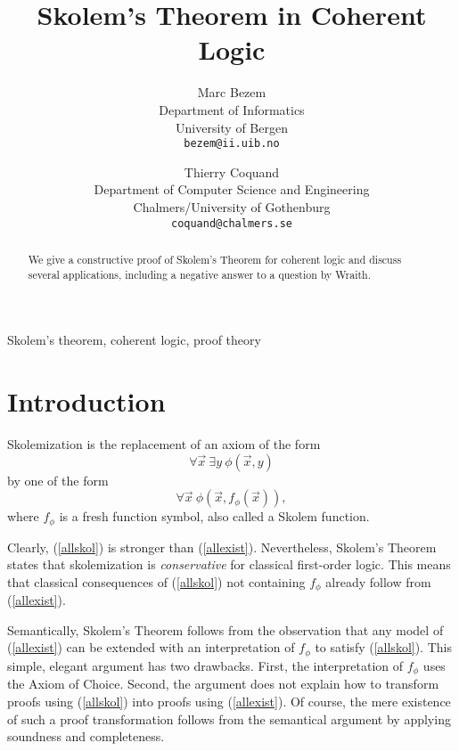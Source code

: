 \documentclass{fundam}
\begin{document}
\title{Skolem's Theorem in Coherent Logic}

\author{%
Marc Bezem\\
Department of Informatics\\
University of Bergen\\
\texttt{bezem@ii.uib.no}
\and
Thierry Coquand\\
Department of Computer Science and Engineering\\
Chalmers/University of Gothenburg\\
\texttt{coquand@chalmers.se}}

\maketitle



\begin{abstract}
We give a constructive proof of Skolem's Theorem for coherent logic
and discuss several applications, including a negative answer to 
a question by Wraith.
\end{abstract}

\begin{keywords}
Skolem's theorem, coherent logic, proof theory
\end{keywords}

\section*{Introduction}
Skolemization is the replacement of an axiom of the form
\begin{equation}\label{allexist}
\forall\vec{x}~\exists y~\phi(\vec{x},y)
\end{equation}
by one of the form
\begin{equation}\label{allskol}
\forall\vec{x}~\phi(\vec{x},f_\phi(\vec{x})),
\end{equation}
where $f_\phi$ is a fresh function symbol, also called a Skolem function.

Clearly, (\ref{allskol}) is stronger than (\ref{allexist}).
Nevertheless, Skolem's Theorem states that skolemization is \emph{conservative}
for classical first-order logic. This means that classical consequences of
(\ref{allskol}) not containing $f_\phi$ already follow from (\ref{allexist}).

Semantically, Skolem's Theorem follows from the observation that
any model of (\ref{allexist}) can be extended with an interpretation
of $f_\phi$ to satisfy (\ref{allskol}). This simple, elegant argument has two
drawbacks. First, the interpretation of $f_\phi$ uses the Axiom of Choice.
Second, the argument does not explain how to transform proofs using
(\ref{allskol}) into proofs using (\ref{allexist}).
Of course, the mere existence of such a proof transformation
follows from the semantical argument by applying soundness and completeness.
\end{document}

